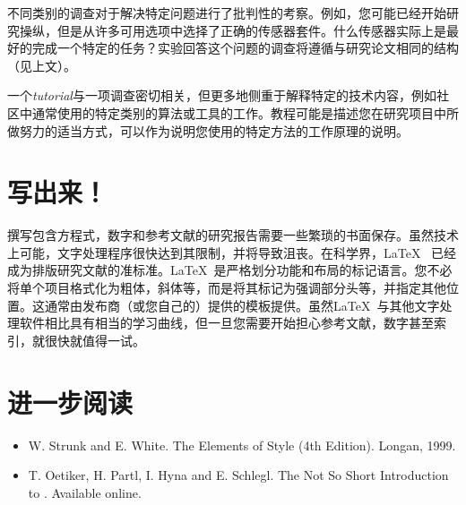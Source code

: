 不同类别的调查对于解决特定问题进行了批判性的考察。例如，您可能已经开始研究操纵，但是从许多可用选项中选择了正确的传感器套件。什么传感器实际上是最好的完成一个特定的任务？实验回答这个问题的调查将遵循与研究论文相同的结构（见上文）。

一个\emph{tutorial}与一项调查密切相关，但更多地侧重于解释特定的技术内容，例如社区中通常使用的特定类别的算法或工具的工作。教程可能是描述您在研究项目中所做努力的适当方式，可以作为说明您使用的特定方法的工作原理的说明。


\section{写出来！}
撰写包含方程式，数字和参考文献的研究报告需要一些繁琐的书面保存。虽然技术上可能，文字处理程序很快达到其限制，并将导致沮丧。在科学界，\LaTeX~ 已经成为排版研究文献的准标准。\LaTeX~是严格划分功能和布局的标记语言。您不必将单个项目格式化为粗体，斜体等，而是将其标记为强调部分头等，并指定其他位置。这通常由发布商（或您自己的）提供的模板提供。虽然\LaTeX~与其他文字处理软件相比具有相当的学习曲线，但一旦您需要开始担心参考文献，数字甚至索引，就很快就值得一试。

\section*{进一步阅读}

\begin{itemize}
\item W. Strunk and E. White. The Elements of Style (4th Edition). Longan, 1999.
\item T. Oetiker, H. Partl, I. Hyna and E. Schlegl. The Not So Short Introduction to \LaTeXe. Available online.
\end{itemize}
